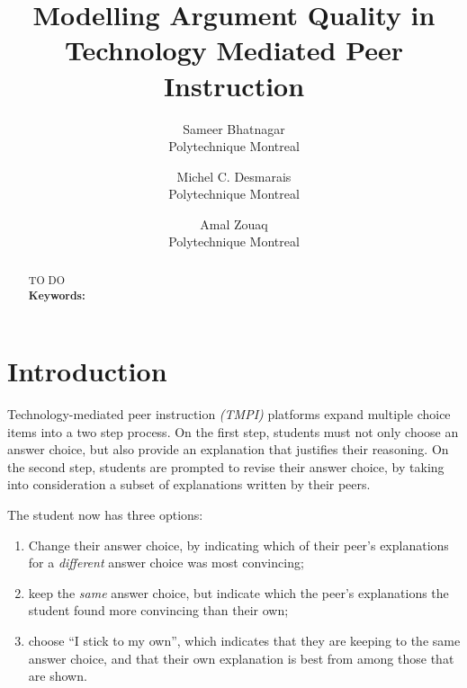 \documentclass[notitlepage,12pt]{jedm}
\begin{document}
	
	\title{Modelling Argument Quality in Technology Mediated Peer Instruction}
	\date{} %
	
	\author{
		{\large Sameer Bhatnagar}
		\\Polytechnique Montreal
	 	\and 
	 	{\large Michel C. Desmarais}
	 	\\Polytechnique Montreal
	 	\and 
	 	{\large Amal Zouaq}
 		\\Polytechnique Montreal
 }

	
	\maketitle
	
	\begin{abstract}
		TO DO
		\\ %
		
		{\parindent0pt
			\textbf{Keywords:} 
		}
	\end{abstract}

\section{Introduction}
Technology-mediated peer instruction \textit{(TMPI)} platforms 
\cite{charles_harnessing_2019}\cite{univeristy_of_british_columbia_ubc/ubcpi_2019}
expand multiple choice items into a two step process.
On the first step, students must not only choose an answer choice, but also 
provide an explanation that justifies their reasoning. 
On the second step, students are prompted to revise their answer choice, by 
taking into consideration a subset of explanations written by their peers.

The student now has three options:
\begin{enumerate}
	\item Change their answer choice, by indicating which of their peer's 
	explanations for a \textit{different} answer choice was most convincing;
	\item keep the \textit{same} answer choice, but indicate which the peer's 
	explanations the student found more convincing than their own;
	\item choose ``I stick to my own'', which indicates that they are keeping 
	to the same answer choice, and that their own explanation is best from 
	among those that are shown.
\end{enumerate}
\end{document}
